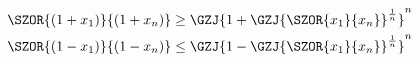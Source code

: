 \begin{gather*}
\SZOR{(1+x_1)}{(1+x_n)} \ge \GZJ{1+\GZJ{\SZOR{x_1}{x_n}}^{\frac{1}{n}}}^{n}\\
\SZOR{(1-x_1)}{(1-x_n)} \le \GZJ{1-\GZJ{\SZOR{x_1}{x_n}}^{\frac{1}{n}}}^{n}\\
\end{gather*}
